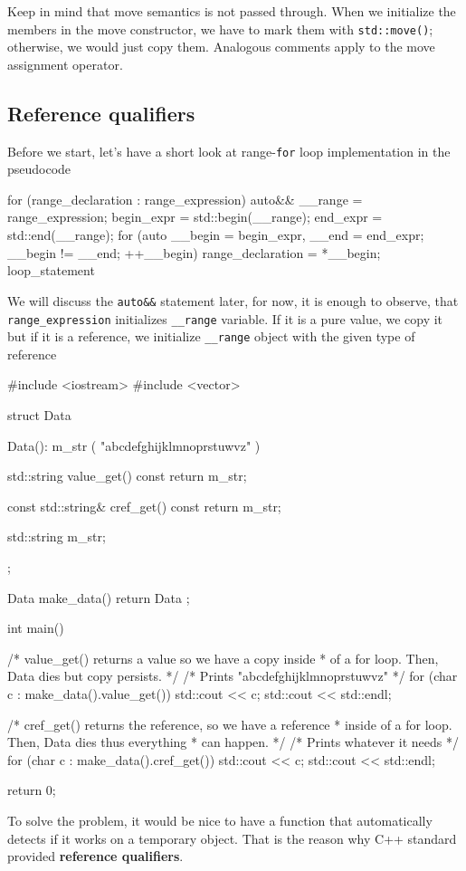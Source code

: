 \documentclass[../main]{subfiles}
\begin{document}
    Keep in mind that move semantics is not passed through. When we initialize the members in the move constructor, we have to mark them
with \texttt{std::move()}; otherwise, we would just copy them. Analogous comments apply to the move assignment operator.

\subsection{Reference qualifiers}
\label{Reference qualifiers}
    Before we start, let's have a short look at range-\texttt{for} loop implementation in the pseudocode
\begin{Code}
    for (range_declaration : range_expression)
    {
      auto&& __range = range_expression;
      begin_expr = std::begin(__range);
      end_expr = std::end(__range);
      for (auto __begin = begin_expr,
                __end = end_expr;
                __begin != __end; ++__begin) {
        range_declaration = *__begin;
        loop_statement
      }
    }
\end{Code}
\noindent
We will discuss the \texttt{auto\&\&} statement later, for now, it is enough to observe, that \texttt{range\_expression} initializes \texttt{\_\_range} variable.
If it is a pure value, we copy it but if it is a reference, we initialize \texttt{\_\_range} object with the given type of reference
\begin{Code}
    #include <iostream>
    #include <vector>

    struct Data
    {
        Data():
            m_str ( "abcdefghijklmnoprstuwvz" )
        {
        }
    
        std::string value_get() const
        {
            return m_str;
        }
    
        const std::string& cref_get() const
        {
            return m_str;
        }
    
        std::string m_str;
    };
    
    Data make_data()
    {
        return Data {};
    }
    
    int main()
    {
        /* value_get() returns a value so we have a copy inside
         * of a for loop. Then, Data dies but copy persists.
         */
        /* Prints "abcdefghijklmnoprstuwvz" */
        for (char c : make_data().value_get())
        {
            std::cout << c;
        }
        std::cout << std::endl;
    
        /* cref_get() returns the reference, so we have a reference
         * inside of a for loop. Then, Data dies thus everything
         * can happen.
        */
        /* Prints whatever it needs */
        for (char c : make_data().cref_get())
        {
            std::cout << c;
        }
        std::cout << std::endl;
    
        return 0;
    }
\end{Code}
\noindent
    To solve the problem, it would be nice to have a function that automatically detects if it works on a temporary object. That is the reason
why C++ standard provided \textbf{reference qualifiers}.\newline
\end{document}
